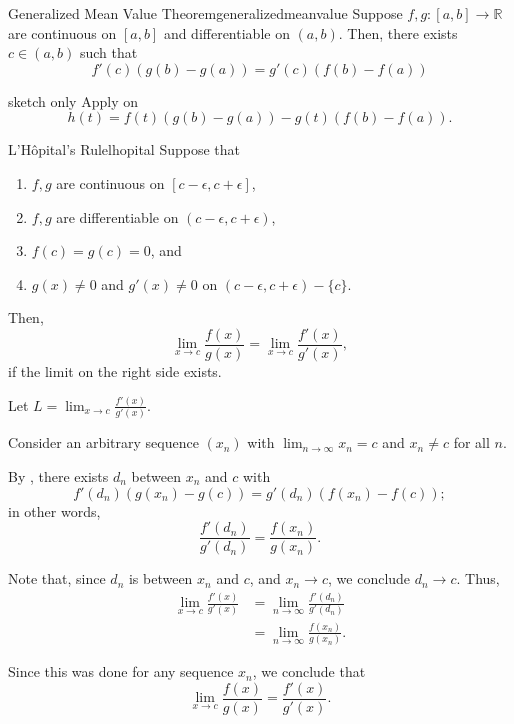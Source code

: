 \begin{thm}{Generalized Mean Value Theorem}{generalizedmeanvalue}
	Suppose \(f, g \colon [a, b] \to \mathbb{R}\) are continuous on \([a, b]\) and differentiable on \((a, b)\). Then, there exists \(c \in (a, b)\) such that \[
		f'(c)(g(b) - g(a)) = g'(c)(f(b) - f(a))
	\]
\end{thm}

\begin{dem}{sketch only}{}
	Apply  on \[h(t) = f(t)(g(b) - g(a)) - g(t)(f(b) - f(a)).\]
\end{dem}

\begin{thm}{L'Hôpital's Rule}{lhopital}
	Suppose that
	\begin{enumerate}[label = \textbullet]
		\item \(f, g\) are continuous on \([c - \epsilon, c + \epsilon]\),
		\item \(f, g\) are differentiable on \((c - \epsilon, c + \epsilon)\),
		\item \(f(c) = g(c) = 0\), and
		\item \(g(x) \neq 0\) and \(g'(x) \neq 0\) on \((c - \epsilon, c + \epsilon) - \{c\}\).
	\end{enumerate}
	Then, \[
		\lim_{x\to c} \frac{f(x)}{g(x)} = \lim_{x \to c} \frac{f'(x)}{g'(x)},
	\]
	if the limit on the right side exists.
\end{thm}

\begin{dem}{}{}
	Let \(L = \lim_{x \to c} \frac{f'(x)}{g'(x)}\).

	Consider an arbitrary sequence \((x_n)\) with \(\lim_{n \to \infty} x_n = c\) and \(x_n \neq c\) for all \(n\).

	By , there exists \(d_n\) between \(x_n\) and \(c\) with \[
		f'(d_n)(g(x_n) -  g(c)) = g'(d_n)(f(x_n) - f(c));
	\]
	in other words, \[
		\frac{f'(d_n)}{g'(d_n)} = \frac{f(x_n)}{g(x_n)}.
	\]

	Note that, since \(d_n\) is between \(x_n\) and \(c\), and \(x_n \to c\), we conclude \(d_n \to c\). Thus, 
	\begin{align*}
		\lim_{x \to c} \frac{f'(x)}{g'(x)} &= \lim_{n \to \infty} \frac{f'(d_n)}{g'(d_n)} \\
			&= \lim_{n \to \infty} \frac{f(x_n)}{g(x_n)}.
	\end{align*}

	Since this was done for any sequence \(x_n\), we conclude that \[
		\lim_{x \to c} \frac{f(x)}{g(x)} = \frac{f'(x)}{g'(x)}.
	\]
\end{dem}

